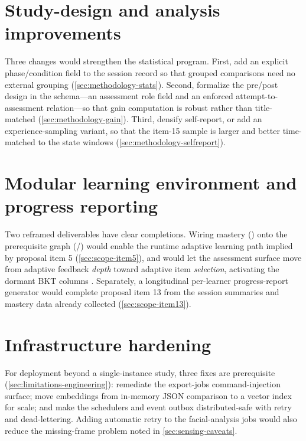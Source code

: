 \section{Study-design and analysis improvements}
\label{sec:future-study}

Three changes would strengthen the statistical program. First, add an
explicit phase/condition field to the session record so that grouped
comparisons need no external grouping (\cref{sec:methodology-stats}).
Second, formalize the pre/post design in the schema---an assessment role
field and an enforced attempt-to-assessment relation---so that gain
computation is robust rather than title-matched
(\cref{sec:methodology-gain}). Third, densify self-report, or add an
experience-sampling variant, so that the item-15 sample is larger and
better time-matched to the state windows
(\cref{sec:methodology-selfreport}).

\section{Modular learning environment and progress reporting}
\label{sec:future-modular}

Two reframed deliverables have clear completions. Wiring mastery
() onto the prerequisite graph
(/) would enable the runtime adaptive
learning path implied by proposal item 5 (\cref{sec:scope-item5}), and
would let the assessment surface move from adaptive feedback \emph{depth}
toward adaptive item \emph{selection}, activating the dormant BKT columns
\citep{corbett1995}. Separately, a longitudinal per-learner progress-report
generator would complete proposal item 13 from the session summaries and
mastery data already collected (\cref{sec:scope-item13}).

\section{Infrastructure hardening}
\label{sec:future-infra}

For deployment beyond a single-instance study, three fixes are prerequisite
(\cref{sec:limitations-engineering}): remediate the export-jobs
command-injection surface; move embeddings from in-memory JSON comparison
to a vector index for scale; and make the schedulers and event outbox
distributed-safe with retry and dead-lettering. Adding automatic retry to
the facial-analysis jobs would also reduce the missing-frame problem noted
in \cref{sec:sensing-caveats}.

